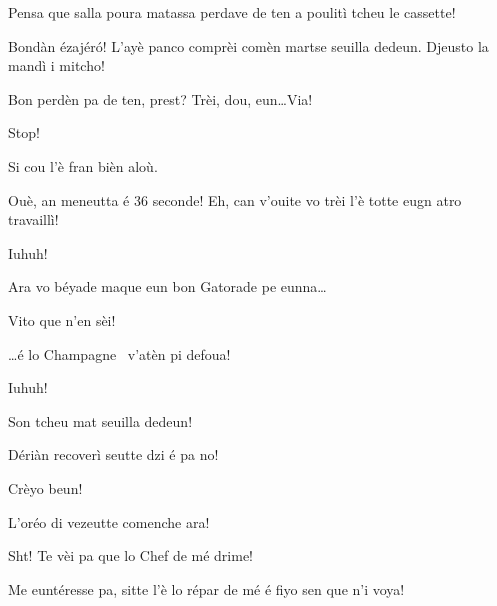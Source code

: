 \begin{drama}
\FennepulisieCspeaks Pensa que salla poura matassa perdave de ten a poulitì tcheu le cassette!

\FennepulisieAspeaks Bondàn ézajér\'o! L’ayè panco comprèi comèn martse seuilla dedeun. Djeusto la mandì i mitcho!

\Starterspeaks Bon perdèn pa de ten, prest? Trèi, dou, eun\ldots Via!




\Starterspeaks Stop!

\FennepulisieBspeaks Si cou l’è fran bièn aloù.

\Starterspeaks Ouè, an meneutta é 36 seconde! Eh, can v'ouite vo trèi l’è totte eugn atro travaillì! 

\Fennepulisiespeaks Iuhuh!

\Starterspeaks Ara vo béyade maque eun bon Gatorade pe eunna\ldots

\FennepulisieCspeaks Vito que n'en sèi!


\Starterspeaks \ldots é lo Champagne \champagne\ v'atèn pi defoua!

\Fennepulisiespeaks Iuhuh!


\Gerominespeaks Son tcheu mat seuilla dedeun!

\Casimirspeaks Dériàn recoverì seutte dzi é pa no!

\Gerominespeaks Crèyo beun!



\Eunfeurmiespeaks {} L'oréo di vezeutte comenche ara!

\Eunfeurmispeaks Sht! Te vèi pa que lo Chef de mé drime!

\Eunfeurmiespeaks {} Me euntéresse pa, sitte l'è lo répar de mé é fiyo sen que n’i voya!


\end{drama}

